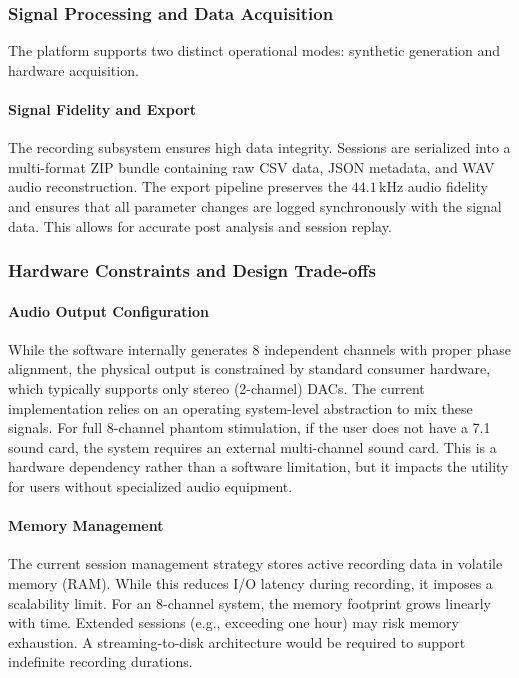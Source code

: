 \documentclass[../00_Main.tex]{subfiles}
\begin{document}
\subsubsection{Signal Processing and Data Acquisition}

The platform supports two distinct operational modes: synthetic generation and hardware acquisition.

\paragraph*{Signal Fidelity and Export}
The recording subsystem ensures high data integrity. Sessions are serialized into a multi-format ZIP bundle containing raw CSV data, JSON metadata, and WAV audio reconstruction. The export pipeline preserves the $44.1\,\text{kHz}$ audio fidelity and ensures that all parameter changes are logged synchronously with the signal data. This allows for accurate post analysis and session replay.

\subsubsection{Hardware Constraints and Design Trade-offs}

\paragraph*{Audio Output Configuration}
While the software internally generates 8 independent channels with proper phase alignment, the physical output is constrained by standard consumer hardware, which typically supports only stereo (2-channel) DACs. The current implementation relies on an operating system-level abstraction to mix these signals. For full 8-channel phantom stimulation, if the user does not have a 7.1 sound card, the system requires an external multi-channel sound card. This is a hardware dependency rather than a software limitation, but it impacts the utility for users without specialized audio equipment.

\paragraph*{Memory Management}
The current session management strategy stores active recording data in volatile memory (RAM). While this reduces I/O latency during recording, it imposes a scalability limit. For an 8-channel system, the memory footprint grows linearly with time. Extended sessions (e.g., exceeding one hour) may risk memory exhaustion. A streaming-to-disk architecture would be required to support indefinite recording durations.

\biblio %
\end{document}
